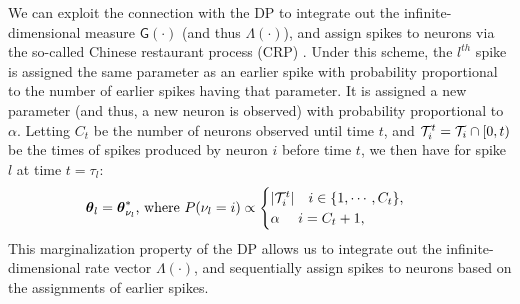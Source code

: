 We can exploit the connection with the DP to %
integrate out the infinite-dimensional measure $\mathsf{G}(\cdot)$ (and thus $\Lambda(\cdot)$), and assign spikes to neurons via 
the so-called Chinese restaurant process (CRP) \citep{Pit2002a}. Under this scheme, the $l^{th}$ spike is assigned the same parameter as an earlier spike with probability 
proportional to the number of earlier spikes having that parameter. It is assigned a new parameter (and thus, a new neuron is observed) with probability 
proportional to $\alpha$. Letting $C_t$ be the number of neurons observed until time $t$, and  $\mathcal{T}^t_i = \mathcal{T}_i \cap [0,t)$ be the times of spikes 
produced by neuron $i$ before time $t$,
we then have for spike $l$ at time $t = \tau_l$: 
\vspace{-.06in}
\begin{align}
 \boldsymbol{\theta}_l = \boldsymbol{\theta}^*_{\nu_l} \text{, where } 
  P({\nu_l} = i) & \propto 
  \begin{cases}
   |\mathcal{T}^t_i| \quad i \in \{1,\cdots, C_{t}\}, \\
   \alpha \quad\ i = C_{t} + 1, 
  \end{cases}  
\label{eq:crp_marg_pr}
\end{align}
This marginalization property of the DP allows us to integrate out the infinite-dimensional rate vector $\mathsf{\Lambda}(\cdot)$, and sequentially 
assign spikes to neurons based on the assignments of earlier spikes.
